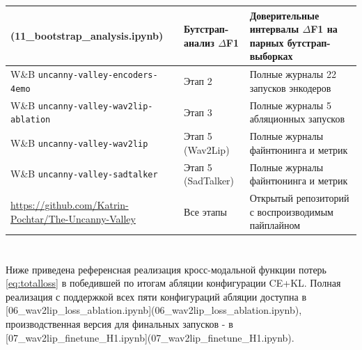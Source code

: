 \documentclass[a4paper, 12pt, oneside, openany]{article}
\begin{document}
\begin{table}[H]
\begin{tabular}{|p{4.7cm}|p{3.5cm}|p{6.5cm}|}
\hline
[11\_bootstrap\_analysis.ipynb](11\_bootstrap\_analysis.ipynb) & Бутстрап-анализ $\Delta$F1 & Доверительные интервалы $\Delta$F1 на парных бутстрап-выборках \\
\hline
W\&B \texttt{uncanny-valley-encoders-4emo} & Этап 2 & Полные журналы 22 запусков энкодеров \\
\hline
W\&B \texttt{uncanny-valley-wav2lip-ablation} & Этап 3 & Полные журналы 5 абляционных запусков \\
\hline
W\&B \texttt{uncanny-valley-wav2lip} & Этап 5 (Wav2Lip) & Полные журналы файнтюнинга и метрик \\
\hline
W\&B \texttt{uncanny-valley-sadtalker} & Этап 5 (SadTalker) & Полные журналы файнтюнинга и метрик \\
\hline
\url{https://github.com/Katrin-Pochtar/The-Uncanny-Valley} & Все этапы & Открытый репозиторий с воспроизводимым пайплайном \\
\hline
\end{tabular}
\end{table}


\newpage
\section{\centering}\label{PrilB}
\begin{center}
\end{center}
\setcounter{equation}{0}
\renewcommand{\theequation}{\Asbuk{section}.\arabic{equation}}
\setcounter{table}{0}
\renewcommand{\thetable}{\Asbuk{section}.\arabic{table}}
\setcounter{figure}{0}
\renewcommand{\thefigure}{\Asbuk{section}.\arabic{figure}}

Ниже приведена референсная реализация кросс-модальной функции потерь \eqref{eq:totalloss} в победившей по итогам абляции конфигурации CE+KL. Полная реализация с поддержкой всех пяти конфигураций абляции доступна в [06\_wav2lip\_loss\_ablation.ipynb](06\_wav2lip\_loss\_ablation.ipynb), производственная версия для финальных запусков - в [07\_wav2lip\_finetune\_H1.ipynb](07\_wav2lip\_finetune\_H1.ipynb).
\end{document}
